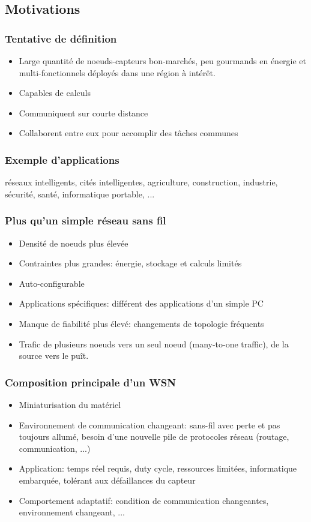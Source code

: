 \documentclass{article}
\begin{document}
\begin{sffamily}
\subsection{Motivations}
\subsubsection{Tentative de définition}
\begin{itemize}
\item Large quantité de noeuds-capteurs bon-marchés, peu gourmands en énergie
  et multi-fonctionnels déployés dans une région à intérêt.
\item Capables de calculs
\item Communiquent sur courte distance
\item Collaborent entre eux pour accomplir des tâches communes
\end{itemize}

\subsubsection{Exemple d'applications}
réseaux intelligents, cités intelligentes, agriculture, construction,
industrie, sécurité, santé, informatique portable, ...

\subsubsection{Plus qu'un simple réseau sans fil}
\begin{itemize}
\item Densité de noeuds plus élevée
\item Contraintes plus grandes: énergie, stockage et calculs limités
\item Auto-configurable
\item Applications spécifiques: différent des applications d'un simple PC
\item Manque de fiabilité plus élevé: changements de topologie fréquents
\item Trafic de plusieurs noeuds vers un seul noeud (many-to-one traffic),
  de la source vers le puît.
\end{itemize}

\subsubsection{Composition principale d'un WSN}
\begin{itemize}
\item Miniaturisation du matériel
\item Environnement de communication changeant:
  sans-fil avec perte et pas toujours allumé, besoin d'une nouvelle pile
  de protocoles réseau (routage, communication, ...)
\item Application: temps réel requis, duty cycle, ressources limitées,
  informatique embarquée, tolérant aux défaillances du capteur
\item Comportement adaptatif: condition de communication changeantes,
  environnement changeant, ...
\end{itemize}


\end{sffamily}
\end{document}
